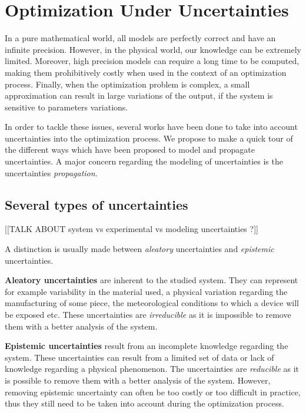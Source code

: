 \section{Optimization Under Uncertainties}

In a pure mathematical world, all models are perfectly correct and have an infinite precision. However, in the physical world, our knowledge can be extremely limited. Moreover, high precision models can require a long time to be computed, making them prohibitively costly when used in the context of an optimization process. Finally, when the optimization problem is complex, a small approximation can result in large variations of the output, if the system is sensitive to parameters variations.

In order to tackle these issues, several works have been done to take into account uncertainties into the optimization process. We propose to make a quick tour of the different ways which have been proposed to model and propagate uncertainties.
A major concern regarding the modeling of uncertainties is the uncertainties \emph{propagation}. 

\subsection{Several types of uncertainties}

[[TALK ABOUT system vs experimental vs modeling uncertainties ?]]

A distinction is usually made between \emph{aleatory} uncertainties and \emph{epistemic} uncertainties.

\textbf{Aleatory uncertainties} are inherent to the studied system. They can represent for example variability in the material used, a physical variation regarding the manufacturing of some piece, the meteorological conditions to which a device will be exposed etc.
These uncertainties are \emph{irreducible} as it is impossible to remove them with a better analysis of the system.

\textbf{Epistemic uncertainties} result from an incomplete knowledge regarding the system. These uncertainties can result from a limited set of data or lack of knowledge regarding a physical phenomenon.
The uncertainties are \emph{reducible} as it is possible to remove them with a better analysis of the system. However, removing epistemic uncertainty can often be too costly or too difficult in practice, thus they still need to be taken into account during the optimization process.

